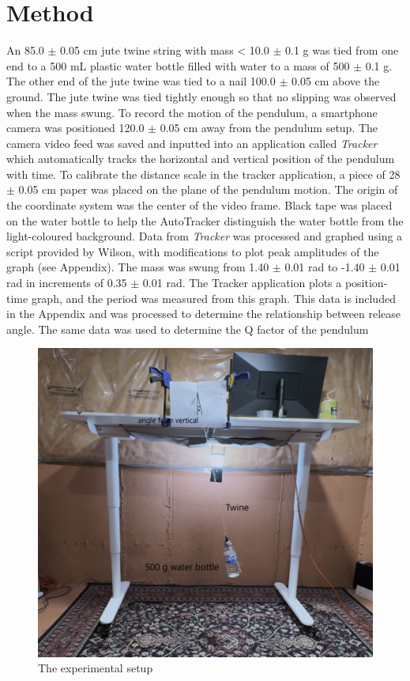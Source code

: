 \documentclass[notitlepage,twocolumn, 12pt]{report}
\begin{document}
    \section{Method}
    An 85.0 $\pm$ 0.05 cm jute twine string with mass < 10.0 $\pm$ 0.1 g was tied from one end to a 500 mL plastic water bottle filled with water to a mass of 500 $\pm$ 0.1 g. The other end of the jute twine was tied to a nail 100.0 $\pm$ 0.05 cm above the ground. The jute twine was tied tightly enough so that no  slipping was observed when the mass swung. To record the motion of the pendulum, a smartphone camera was positioned 120.0 $\pm$ 0.05 cm away from the pendulum setup. The camera video feed was saved and inputted into an application called \textit{Tracker} which automatically tracks the horizontal and vertical position of the pendulum with time. To calibrate the distance scale in the tracker application, a piece of 28 $\pm$ 0.05 cm paper was placed on the plane of the pendulum motion. The origin of the coordinate system was the center of the video frame. Black tape was placed on the water bottle to help the AutoTracker distinguish the water bottle from the light-coloured background. 
    Data from \textit{Tracker} was processed and graphed using a script provided by Wilson, with modifications to plot peak amplitudes of the graph (see Appendix).
    The mass was swung from 1.40 $\pm$ 0.01 rad to -1.40 $\pm$ 0.01 rad in increments of 0.35 $\pm$ 0.01 rad. The Tracker application plots a position-time graph, and the period was measured from this graph. This data is included in the Appendix and was processed to determine the relationship between release angle. The same data was used to determine the Q factor of the pendulum
    \begin{figure}[H]
        \includegraphics[width=\linewidth]{temp.png}
        \caption{The experimental setup}
    \end{figure}
\end{document}
